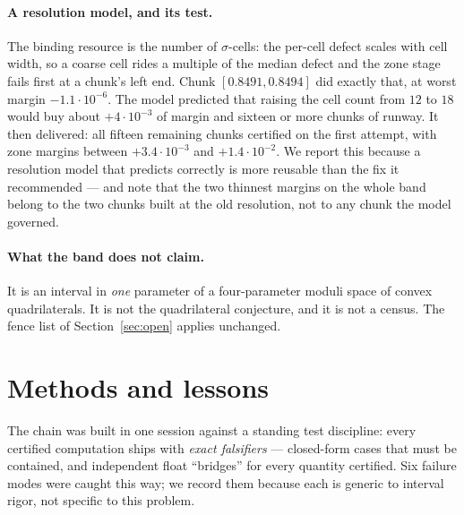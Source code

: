 \documentclass[11pt]{article}
\begin{document}
\paragraph{A resolution model, and its test.} The binding resource is
the number of $\sigma$-cells: the per-cell defect scales with cell width,
so a coarse cell rides a multiple of the median defect and the zone stage
fails first at a chunk's left end. Chunk $[0.8491,0.8494]$ did exactly
that, at worst margin $-1.1\cdot10^{-6}$. The model predicted that
raising the cell count from $12$ to $18$ would buy about
$+4\cdot10^{-3}$ of margin and sixteen or more chunks of runway. It then
delivered: all fifteen remaining chunks certified on the first attempt,
with zone margins between $+3.4\cdot10^{-3}$ and $+1.4\cdot10^{-2}$. We
report this because a resolution model that predicts correctly is more
reusable than the fix it recommended --- and note that the two thinnest
margins on the whole band belong to the two chunks built at the old
resolution, not to any chunk the model governed.

\paragraph{What the band does not claim.} It is an interval in
\emph{one} parameter of a four-parameter moduli space of convex
quadrilaterals. It is not the quadrilateral conjecture, and it is not a
census. The fence list of Section~\ref{sec:open} applies unchanged.

\section{Methods and lessons}\label{sec:lessons}

The chain was built in one session against a standing test discipline:
every certified computation ships with \emph{exact falsifiers} ---
closed-form cases that must be contained, and independent float
``bridges'' for every quantity certified. Six failure modes were caught
this way; we record them because each is generic to interval rigor,
not specific to this problem.
\end{document}
